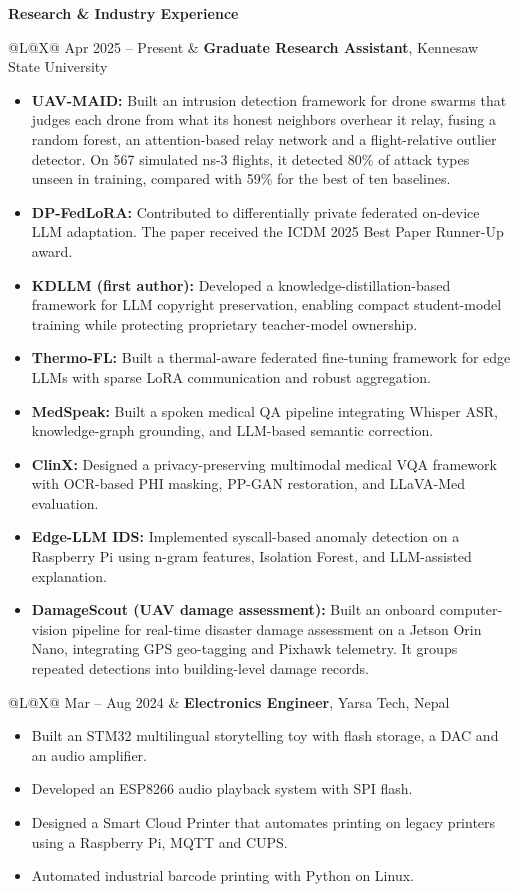 \documentclass[letterpaper,10pt]{article}
\makeatletter
\newcommand{\sectiontitle}[1]{%
  \needspace{3\baselineskip}%
  \vspace{5pt}%
  {\color{accent}\large\bfseries #1}\par
  \vspace{1.5pt}{\color{accent}\hrule height 0.5pt}%
  \vspace{4pt}%
}
\newcommand{\cvrow}[2]{%
  \noindent\begin{tabularx}{\linewidth}{@{}L@{\hspace{0.14in}}X@{}}
    #1 & #2
  \end{tabularx}\par\vspace{3pt}%
}
\makeatother
\begin{document}
\sectiontitle{Research \& Industry Experience}
\cvrow{Apr 2025 -- Present}{\textbf{Graduate Research Assistant}, Kennesaw State University
\begin{itemize}
  \item \textbf{UAV-MAID:} Built an intrusion detection framework for drone swarms that judges each drone from what its honest neighbors overhear it relay, fusing a random forest, an attention-based relay network and a flight-relative outlier detector. On 567 simulated ns-3 flights, it detected 80\% of attack types unseen in training, compared with 59\% for the best of ten baselines.
  \item \textbf{DP-FedLoRA:} Contributed to differentially private federated on-device LLM adaptation. The paper received the ICDM 2025 Best Paper Runner-Up award.
  \item \textbf{KDLLM (first author):} Developed a knowledge-distillation-based framework for LLM copyright preservation, enabling compact student-model training while protecting proprietary teacher-model ownership.
  \item \textbf{Thermo-FL:} Built a thermal-aware federated fine-tuning framework for edge LLMs with sparse LoRA communication and robust aggregation.
  \item \textbf{MedSpeak:} Built a spoken medical QA pipeline integrating Whisper ASR, knowledge-graph grounding, and LLM-based semantic correction.
  \item \textbf{ClinX:} Designed a privacy-preserving multimodal medical VQA framework with OCR-based PHI masking, PP-GAN restoration, and LLaVA-Med evaluation.
  \item \textbf{Edge-LLM IDS:} Implemented syscall-based anomaly detection on a Raspberry Pi using n-gram features, Isolation Forest, and LLM-assisted explanation.
  \item \textbf{DamageScout (UAV damage assessment):} Built an onboard computer-vision pipeline for real-time disaster damage assessment on a Jetson Orin Nano, integrating GPS geo-tagging and Pixhawk telemetry. It groups repeated detections into building-level damage records.
\end{itemize}}
\cvrow{Mar -- Aug 2024}{\textbf{Electronics Engineer}, Yarsa Tech, Nepal
\begin{itemize}
  \item Built an STM32 multilingual storytelling toy with flash storage, a DAC and an audio amplifier.
  \item Developed an ESP8266 audio playback system with SPI flash.
  \item Designed a Smart Cloud Printer that automates printing on legacy printers using a Raspberry Pi, MQTT and CUPS.
  \item Automated industrial barcode printing with Python on Linux.
\end{itemize}}
\end{document}

